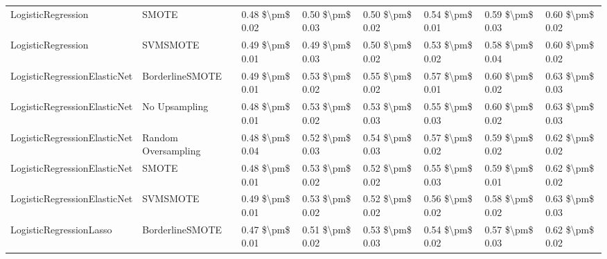 \begin{tabular}{llllllll}
             LogisticRegression &                         SMOTE & 0.48 \$\textbackslash pm\$ 0.02 &           0.50 \$\textbackslash pm\$ 0.03 &       0.50 \$\textbackslash pm\$ 0.02 &        0.54 \$\textbackslash pm\$ 0.01 &                         0.59 \$\textbackslash pm\$ 0.03 &     0.60 \$\textbackslash pm\$ 0.02 \\
             LogisticRegression &                      SVMSMOTE & 0.49 \$\textbackslash pm\$ 0.01 &           0.49 \$\textbackslash pm\$ 0.03 &       0.50 \$\textbackslash pm\$ 0.02 &        0.53 \$\textbackslash pm\$ 0.02 &                         0.58 \$\textbackslash pm\$ 0.04 &     0.60 \$\textbackslash pm\$ 0.02 \\
   LogisticRegressionElasticNet &               BorderlineSMOTE & 0.49 \$\textbackslash pm\$ 0.01 &           0.53 \$\textbackslash pm\$ 0.02 &       0.55 \$\textbackslash pm\$ 0.02 &        0.57 \$\textbackslash pm\$ 0.01 &                         0.60 \$\textbackslash pm\$ 0.02 &     0.63 \$\textbackslash pm\$ 0.03 \\
   LogisticRegressionElasticNet &                 No Upsampling & 0.48 \$\textbackslash pm\$ 0.01 &           0.53 \$\textbackslash pm\$ 0.02 &       0.53 \$\textbackslash pm\$ 0.03 &        0.55 \$\textbackslash pm\$ 0.03 &                         0.60 \$\textbackslash pm\$ 0.02 &     0.63 \$\textbackslash pm\$ 0.03 \\
   LogisticRegressionElasticNet &           Random Oversampling & 0.48 \$\textbackslash pm\$ 0.04 &           0.52 \$\textbackslash pm\$ 0.03 &       0.54 \$\textbackslash pm\$ 0.03 &        0.57 \$\textbackslash pm\$ 0.02 &                         0.59 \$\textbackslash pm\$ 0.02 &     0.62 \$\textbackslash pm\$ 0.02 \\
   LogisticRegressionElasticNet &                         SMOTE & 0.48 \$\textbackslash pm\$ 0.01 &           0.53 \$\textbackslash pm\$ 0.02 &       0.52 \$\textbackslash pm\$ 0.02 &        0.55 \$\textbackslash pm\$ 0.03 &                         0.59 \$\textbackslash pm\$ 0.01 &     0.62 \$\textbackslash pm\$ 0.02 \\
   LogisticRegressionElasticNet &                      SVMSMOTE & 0.49 \$\textbackslash pm\$ 0.01 &           0.53 \$\textbackslash pm\$ 0.02 &       0.52 \$\textbackslash pm\$ 0.02 &        0.56 \$\textbackslash pm\$ 0.02 &                         0.58 \$\textbackslash pm\$ 0.02 &     0.63 \$\textbackslash pm\$ 0.03 \\
        LogisticRegressionLasso &               BorderlineSMOTE & 0.47 \$\textbackslash pm\$ 0.01 &           0.51 \$\textbackslash pm\$ 0.02 &       0.53 \$\textbackslash pm\$ 0.03 &        0.54 \$\textbackslash pm\$ 0.02 &                         0.57 \$\textbackslash pm\$ 0.03 &     0.62 \$\textbackslash pm\$ 0.02 \\

\end{tabular}
